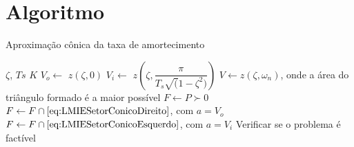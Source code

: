 \chapter{Algoritmo}

\begin{algorithm}[hbt!]
  \caption{Aproximação cônica da taxa de amortecimento}\label{alg:AproximacaoConicaZeta}
  \begin{algorithmic}[1]
    \Require $\zeta$, $Ts$
    \Ensure $K$
    \State $V_o \gets $ $z(\zeta,0)$
    \State $V_i \gets $ $z\left(\zeta,\dfrac{\pi}{T_s\sqrt(1-\zeta^2)}\right)$
    \State $V \gets z(\zeta,\omega_n)$, onde a área do triângulo formado é a maior possível
    \State $F \gets P \succ 0$
    \State $F \gets F \cap \eqref{eq:LMIESetorConicoDireito}$, com $a = V_o$
    \State $F \gets F \cap \eqref{eq:LMIESetorConicoEsquerdo}$, com $a = V_i$
    \State Verificar se o problema é factível
  \end{algorithmic}
\end{algorithm}